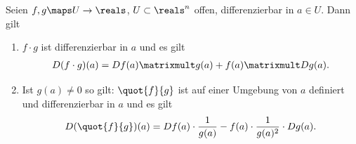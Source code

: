 \begin{satz}
    Seien \( f,g\maps U\to \reals \), \( U\subset \reals^n \) offen, differenzierbar in \( a\in U \). Dann gilt
    \begin{enumerate}
        \item \label{produktregel} \( f\cdot g \) ist differenzierbar in \( a \) und es gilt
        \begin{align*}
            D(f\cdot g)(a)=Df(a)\matrixmult g(a)+f(a)\matrixmult Dg(a).
        \end{align*}
        \item \label{quotientenregel} Ist \( g(a)\neq 0 \) so gilt: \( \quot{f}{g} \) ist auf einer Umgebung von \( a \) definiert und differenzierbar in \( a \) und es gilt 
        \begin{align*}
            D(\quot{f}{g})(a)=Df(a)\cdot\frac{1}{g(a)}-f(a)\cdot\frac{1}{g(a)^2}\cdot Dg(a).
        \end{align*}
    \end{enumerate}
    
\end{satz}
